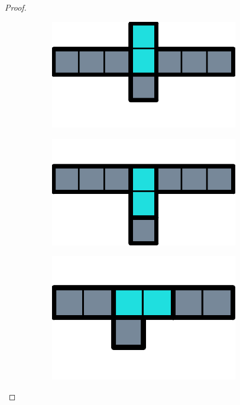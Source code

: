 \begin{proof}
\begin{figure}[ht]
  \centering
  \begin{subfigure}[b]{0.15\textwidth}
    \centering
    \includegraphics[width=0.9\textwidth]{./pictures/dominoes/proff-floating/clear-row-1.pdf}
    \caption{\label{dom:proff-floating:clear1}}
  \end{subfigure}
  \begin{subfigure}[b]{0.15\textwidth}
    \centering
    \includegraphics[width=0.9\textwidth]{./pictures/dominoes/proff-floating/clear-row-2.pdf}
    \caption{\label{dom:proff-floating:clear2}}
  \end{subfigure}
  \begin{subfigure}[b]{0.15\textwidth}
    \centering
    \includegraphics[width=0.9\textwidth]{./pictures/dominoes/proff-floating/clear-row-3.pdf}

\end{subfigure}
\end{figure}
\end{proof}
